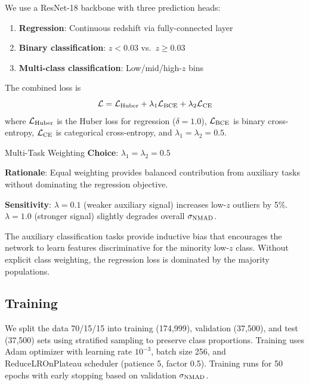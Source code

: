 \documentclass[linenumbers,twocolumn]{aastex7}
\newcommand{\sigmaNMAD}{\ensuremath{\sigma_{\rm NMAD}}}
\begin{document}
We use a ResNet-18 backbone \citep{He2016} with three prediction heads:
\begin{enumerate}
    \item \textbf{Regression}: Continuous redshift via fully-connected layer
    \item \textbf{Binary classification}: $z < 0.03$ vs.\ $z \geq 0.03$
    \item \textbf{Multi-class classification}: Low/mid/high-$z$ bins
\end{enumerate}

The combined loss is
\begin{equation}
\mathcal{L} = \mathcal{L}_{\rm Huber} + \lambda_1 \mathcal{L}_{\rm BCE} + 
\lambda_2 \mathcal{L}_{\rm CE}
\end{equation}
where $\mathcal{L}_{\rm Huber}$ is the Huber loss for regression ($\delta = 1.0$), 
$\mathcal{L}_{\rm BCE}$ is binary cross-entropy, $\mathcal{L}_{\rm CE}$ is 
categorical cross-entropy, and $\lambda_1 = \lambda_2 = 0.5$.

\begin{assumption}{Multi-Task Weighting}
\textbf{Choice}: $\lambda_1 = \lambda_2 = 0.5$

\textbf{Rationale}: Equal weighting provides balanced contribution from auxiliary 
tasks without dominating the regression objective.

\textbf{Sensitivity}: $\lambda = 0.1$ (weaker auxiliary signal) increases low-$z$ 
outliers by 5\%. $\lambda = 1.0$ (stronger signal) slightly degrades overall 
\sigmaNMAD.
\end{assumption}

The auxiliary classification tasks provide inductive bias that encourages the 
network to learn features discriminative for the minority low-$z$ class. Without 
explicit class weighting, the regression loss is dominated by the majority 
populations.

\subsection{Training}

We split the data 70/15/15 into training (174,999), validation (37,500), and 
test (37,500) sets using stratified sampling to preserve class proportions. 
Training uses Adam optimizer with learning rate $10^{-3}$, batch size 256, and 
ReduceLROnPlateau scheduler (patience 5, factor 0.5). Training runs for 50 
epochs with early stopping based on validation \sigmaNMAD.
\end{document}
